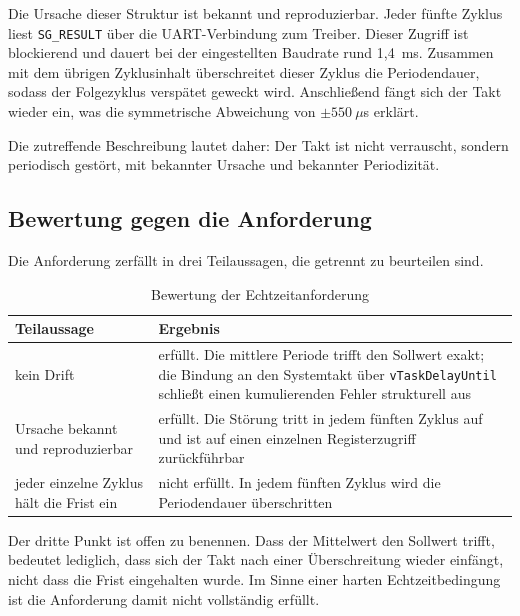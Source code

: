 Die Ursache dieser Struktur ist bekannt und reproduzierbar. Jeder fünfte Zyklus liest
\texttt{SG\_RESULT} über die UART-Verbindung zum Treiber. Dieser Zugriff ist blockierend
und dauert bei der eingestellten Baudrate rund 1,4~ms. Zusammen mit dem übrigen
Zyklusinhalt überschreitet dieser Zyklus die Periodendauer, sodass der Folgezyklus
verspätet geweckt wird. Anschließend fängt sich der Takt wieder ein, was die symmetrische
Abweichung von $\pm 550~\mu$s erklärt.

Die zutreffende Beschreibung lautet daher: Der Takt ist nicht verrauscht, sondern
periodisch gestört, mit bekannter Ursache und bekannter Periodizität.

\subsection*{Bewertung gegen die Anforderung}

Die Anforderung zerfällt in drei Teilaussagen, die getrennt zu beurteilen sind.

\begin{table}[htbp]
    \centering
    \caption{Bewertung der Echtzeitanforderung}
    \label{tab:echtzeit_bewertung}
    \begin{tabular}{lp{8cm}}
        \hline
        Teilaussage & Ergebnis \\
        \hline
        kein Drift
            & erfüllt. Die mittlere Periode trifft den Sollwert exakt; die Bindung an den
              Systemtakt über \texttt{vTaskDelayUntil} schließt einen kumulierenden Fehler
              strukturell aus \\[0.4em]
        Ursache bekannt und reproduzierbar
            & erfüllt. Die Störung tritt in jedem fünften Zyklus auf und ist auf einen
              einzelnen Registerzugriff zurückführbar \\[0.4em]
        jeder einzelne Zyklus hält die Frist ein
            & nicht erfüllt. In jedem fünften Zyklus wird die Periodendauer überschritten \\
        \hline
    \end{tabular}
\end{table}

Der dritte Punkt ist offen zu benennen. Dass der Mittelwert den Sollwert trifft, bedeutet
lediglich, dass sich der Takt nach einer Überschreitung wieder einfängt, nicht dass die
Frist eingehalten wurde. Im Sinne einer harten Echtzeitbedingung ist die Anforderung damit
nicht vollständig erfüllt.

